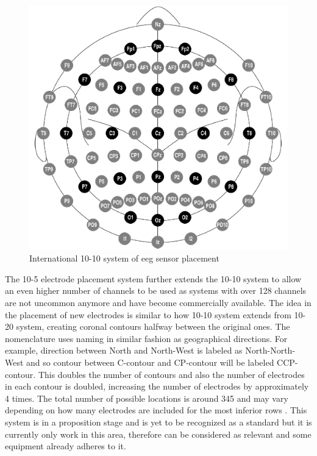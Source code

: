 \begin{figure}[htb]
	\centering
	\includegraphics[width=1\linewidth]{fig/system10-10.png}
	\caption[Caption for LOF]{International 10-10 system of \gls{eeg} sensor placement\protect\footnotemark}
	\label{fig:system1010}
\end{figure}

The 10-5 electrode placement system further extends the 10-10 system to allow an
even higher number of channels to be used as systems with over 128 channels are
not uncommon anymore and have become commercially available. The idea in the
placement of new electrodes is similar to how 10-10 system extends from 10-20 system,
creating coronal contours halfway between the original ones. The nomenclature
uses naming in similar fashion as geographical directions. For example,
direction between North and North-West is labeled as North-North-West and so
contour between C-contour and CP-contour will be labeled CCP-contour.
This doubles the number of contours and also the number of electrodes in each contour
is doubled, increasing the number of electrodes by approximately 4 times.
The total number of possible locations is around 345 and may vary depending on
how many electrodes are included for the most inferior rows \cite{placeSys}.
This system is in a proposition stage and is yet to be recognized as a standard but
it is currently only work in this area, therefore can be considered as relevant
and some equipment already adheres to it.

